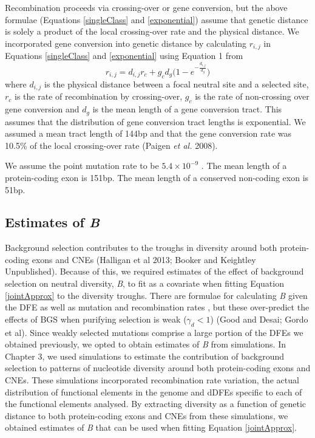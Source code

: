 \documentclass[11pt]{article}
\begin{document}
	Recombination proceeds via crossing-over or gene conversion, but the above formulae (Equations \ref{singleClass} and \ref{exponential}) assume that genetic distance is solely a product of the local crossing-over rate and the physical distance. We incorporated gene conversion into genetic distance by calculating $r_{i,j}$ in Equations \ref{singleClass} and \ref{exponential} using Equation 1 from \cite{RN361}
		\begin{equation}
		\label{geneConversion}
		r_{i,j} = d_{i,j} r_c + g_c d_g \Bigg( 1 - e ^{-\frac{d_{i,j}}{d_g}} \Bigg)
		\end{equation}
	where $d_{i,j}$ is the physical distance between a focal neutral site and a selected site, $r_c$ is the rate of recombination by crossing-over, $g_c$ is the rate of non-crossing over gene conversion and $d_g$ is the mean length of a gene conversion tract. This assumes that the distribution of gene conversion tract lengths is exponential. We assumed a mean tract length of 144bp and that the gene conversion rate was 10.5\% of the local crossing-over rate (Paigen \textit{et al.} 2008).

	We assume the point mutation rate to be $5.4 \times 10^{-9}$ \citep{RN228}.
 	The mean length of a protein-coding exon is 151bp.
 	The mean length of a conserved non-coding exon is 51bp.
	
	
	\subsection*{Estimates of \textit{B}} 
 
 	Background selection contributes to the troughs in diversity around both protein-coding exons and CNEs (Halligan et al 2013; Booker and Keightley Unpublished). Because of this, we required estimates of the effect of background selection on neutral diversity, \textit{B}, to fit as a covariate when fitting Equation \ref{jointApprox} to the diversity troughs. There are formulae for calculating \textit{B} given the DFE as well as mutation and recombination rates \citep{RN157, RN206}, but these over-predict the effects of BGS when purifying selection is weak ($\gamma_d < 1$) (Good and Desai; Gordo et al). Since weakly selected mutations comprise a large portion of the DFEs we obtained previously, we opted to obtain estimates of \textit{B} from simulations. In Chapter 3, we used simulations to estimate the contribution of background selection to patterns of nucleotide diversity around both protein-coding exons and CNEs. These simulations incorporated recombination rate variation, the actual distribution of functional elements in the genome and dDFEs specific to each of the functional elements analysed. By extracting diversity as a function of genetic distance to both protein-coding exons and CNEs from these simulations, we obtained estimates of \textit{B} that can be used when fitting Equation \ref{jointApprox}.
 	
\end{document}
